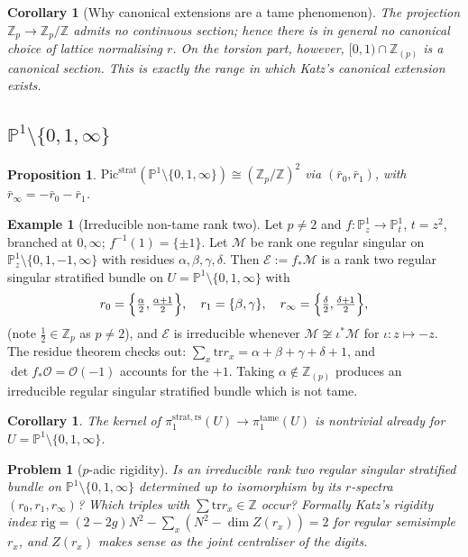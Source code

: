 \documentclass[11pt,reqno]{amsart}
\newcommand{\Zp}{\mathbb{Z}_p}
\newcommand{\ZZ}{\mathbb{Z}}
\newcommand{\PP}{\mathbb{P}}
\newcommand{\cO}{\mathcal{O}}
\newcommand{\cE}{\mathcal{E}}
\newcommand{\cM}{\mathcal{M}}
\newcommand{\rs}{\mathrm{rs}}
\newcommand{\tame}{\mathrm{tame}}
\newcommand{\strat}{\mathrm{strat}}
\newcommand{\Pic}{\mathrm{Pic}}
\newcommand{\tr}{\mathrm{tr}}
\theoremstyle{plain}
\newtheorem{proposition}[theorem]{Proposition}
\newtheorem{corollary}[theorem]{Corollary}
\newtheorem{problem}[theorem]{Problem}
\theoremstyle{definition}
\newtheorem{example}[theorem]{Example}
\theoremstyle{remark}
\numberwithin{equation}{section}
\begin{document}
\begin{corollary}[Why canonical extensions are a tame phenomenon]\label{cor:nosection}
The projection $\Zp\to\Zp/\ZZ$ admits no continuous section; hence there
is in general no canonical choice of lattice normalising $r$.  On the
torsion part, however, $[0,1)\cap\ZZ_{(p)}$ is a canonical section.  This
is exactly the range in which Katz's canonical extension \cite{Katz}
exists.
\end{corollary}

\subsection{$\PP^1\setminus\{0,1,\infty\}$}
\begin{proposition}
$\Pic^{\strat}(\PP^1\setminus\{0,1,\infty\})\cong(\Zp/\ZZ)^2$ via
$(\bar r_0,\bar r_1)$, with $\bar r_\infty=-\bar r_0-\bar r_1$.
\end{proposition}

\begin{example}[Irreducible non-tame rank two]\label{ex:GL2}
Let $p\ne2$ and $f\colon\PP^1_z\to\PP^1_t$, $t=z^2$, branched at
$0,\infty$; $f^{-1}(1)=\{\pm1\}$.  Let $\cM$ be rank one regular singular
on $\PP^1_z\setminus\{0,1,-1,\infty\}$ with residues
$\alpha,\beta,\gamma,\delta$.  Then $\cE:=f_*\cM$ is a rank two regular
singular stratified bundle on $U=\PP^1\setminus\{0,1,\infty\}$ with
\[
   r_0=\Bigl\{\tfrac\alpha2,\tfrac{\alpha+1}2\Bigr\},\quad
   r_1=\{\beta,\gamma\},\quad
   r_\infty=\Bigl\{\tfrac\delta2,\tfrac{\delta+1}2\Bigr\},
\]
(note $\tfrac12\in\Zp$ as $p\ne2$), and $\cE$ is irreducible whenever
$\cM\not\cong\iota^*\cM$ for $\iota\colon z\mapsto-z$.  The residue
theorem checks out: $\sum_x\tr r_x=\alpha+\beta+\gamma+\delta+1$, and
$\det f_*\cO=\cO(-1)$ accounts for the $+1$.
Taking $\alpha\notin\ZZ_{(p)}$ produces an irreducible regular singular
stratified bundle which is not tame.
\end{example}

\begin{corollary}
The kernel of $\pi_1^{\strat,\rs}(U)\to\pi_1^{\tame}(U)$ is nontrivial
already for $U=\PP^1\setminus\{0,1,\infty\}$.
\end{corollary}

\begin{problem}[$p$-adic rigidity]\label{prob:rigid}
Is an irreducible rank two regular singular stratified bundle on
$\PP^1\setminus\{0,1,\infty\}$ determined up to isomorphism by its
$r$-spectra $(r_0,r_1,r_\infty)$?  Which triples with
$\sum\tr r_x\in\ZZ$ occur?  Formally Katz's rigidity index
$\mathrm{rig}=(2-2g)N^2-\sum_x(N^2-\dim Z(r_x))=2$ for regular semisimple
$r_x$, and $Z(r_x)$ makes sense as the joint centraliser of the digits.
\end{problem}
\end{document}
